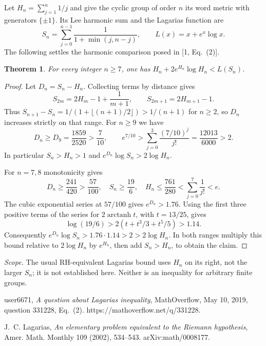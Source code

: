 \documentclass[11pt,a4paper]{article}
\numberwithin{equation}{section}
\newtheorem{theorem}{Theorem}[section]
\theoremstyle{definition}
\theoremstyle{remark}
\begin{document}
Let $H_n=\sum_{j=1}^n 1/j$ and give the cyclic group of order $n$ its word metric with generators $\{\pm1\}$. Its Lee harmonic sum and the Lagarias function are
\[
 S_n=\sum_{j=0}^{n-1}\frac1{1+\min(j,n-j)},\qquad L(x)=x+e^x\log x .
\]
The following settles the harmonic comparison posed in [1, Eq.~(2)].
\begin{theorem}
For every integer $n\ge7$, one has $H_n+2e^{H_n}\log H_n<L(S_n)$.
\end{theorem}
\begin{proof}
Let $D_n=S_n-H_n$. Collecting terms by distance gives
\[
 S_{2m}=2H_m-1+\frac1{m+1},\qquad S_{2m+1}=2H_{m+1}-1 .
\]
Thus $S_{n+1}-S_n=1/(1+\lfloor(n+1)/2\rfloor)>1/(n+1)$ for $n\ge2$, so $D_n$ increases strictly on that range. For $n\ge9$ we have
\[
 D_n\ge D_9=\frac{1859}{2520}>\frac7{10},
 \qquad e^{7/10}>\sum_{j=0}^3\frac{(7/10)^j}{j!}=\frac{12013}{6000}>2 .
\]
In particular $S_n>H_n>1$ and $e^{D_n}\log S_n>2\log H_n$.

For $n=7,8$ monotonicity gives
\[
 D_n\ge\frac{241}{420}>\frac{57}{100},\quad
 S_n\ge\frac{19}{6},\quad H_n\le\frac{761}{280}<\sum_{j=0}^7\frac1{j!}<e.
\]
The cubic exponential series at $57/100$ gives $e^{D_n}>1.76$. Using the first three positive terms of the series for $2\operatorname{arctanh}t$, with $t=13/25$, gives
\[
 \log(19/6)>2(t+t^3/3+t^5/5)>1.14 .
\]
Consequently $e^{D_n}\log S_n>1.76\cdot1.14>2>2\log H_n$. In both ranges multiply this bound relative to $2\log H_n$ by $e^{H_n}$, then add $S_n>H_n$, to obtain the claim.
\end{proof}
\noindent\textit{Scope.} The usual RH-equivalent Lagarias bound uses $H_n$ on its right, not the larger $S_n$; it is not established here. Neither is an inequality for arbitrary finite groups.
\smallskip
\par\noindent[1] user6671, \emph{A question about Lagarias inequality}, MathOverflow, May 10, 2019, question 331228, Eq.~(2). https://mathoverflow.net/q/331228.
\par\noindent[2] J.~C. Lagarias, \emph{An elementary problem equivalent to the Riemann hypothesis}, Amer. Math. Monthly 109 (2002), 534--543. arXiv:math/0008177.

\par\endgroup

\begingroup

\end{document}
